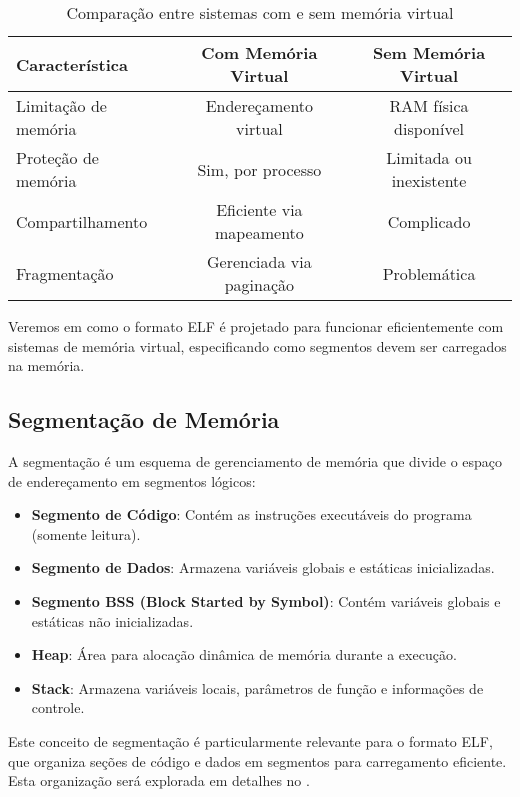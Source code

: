 \begin{table}[ht]
    \centering
    \caption{Comparação entre sistemas com e sem memória virtual}
    \label{tab:vm_comparison}
    \begin{tabular}{|l|c|c|}
        \hline
        \textbf{Característica} & \textbf{Com Memória Virtual} & \textbf{Sem Memória Virtual} \\
        \hline
        Limitação de memória & Endereçamento virtual & RAM física disponível \\
        Proteção de memória & Sim, por processo & Limitada ou inexistente \\
        Compartilhamento & Eficiente via mapeamento & Complicado \\
        Fragmentação & Gerenciada via paginação & Problemática \\
        \hline
    \end{tabular}
\end{table}

Veremos em  como o formato ELF é projetado para funcionar eficientemente com sistemas de memória virtual, especificando como segmentos devem ser carregados na memória.

\subsection{Segmentação de Memória}\label{subsec:segmentation}

A segmentação é um esquema de gerenciamento de memória que divide o espaço de endereçamento em segmentos lógicos:

\begin{itemize}
    \item \textbf{Segmento de Código}: Contém as instruções executáveis do programa (somente leitura).
    \item \textbf{Segmento de Dados}: Armazena variáveis globais e estáticas inicializadas.
    \item \textbf{Segmento BSS (Block Started by Symbol)}: Contém variáveis globais e estáticas não inicializadas.
    \item \textbf{Heap}: Área para alocação dinâmica de memória durante a execução.
    \item \textbf{Stack}: Armazena variáveis locais, parâmetros de função e informações de controle.
\end{itemize}

Este conceito de segmentação é particularmente relevante para o formato ELF, que organiza seções de código e dados em segmentos para carregamento eficiente. Esta organização será explorada em detalhes no .

